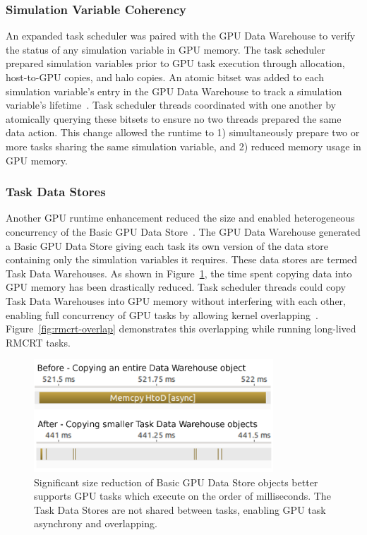 \documentclass[12pt]{article}
\begin{document}
\subsubsection{Simulation Variable Coherency}
\label{ch:simulation_variable_coherency}

An expanded task scheduler was paired with the GPU Data Warehouse to verify the status of any simulation variable in GPU memory.  The task scheduler prepared simulation variables prior to GPU task execution through allocation, host-to-GPU copies, and halo copies.  An atomic bitset was added to each simulation variable's entry in the GPU Data Warehouse to track a simulation variable's lifetime~\cite{ijpp16}.  Task scheduler threads coordinated with one another by atomically querying these bitsets to ensure no two threads prepared the same data action.  This change allowed the runtime to 1) simultaneously prepare two or more tasks sharing the same simulation variable, and 2) reduced memory usage in GPU memory.


\subsubsection{Task Data Stores}
\label{ch:task_data_warehouse}


Another GPU runtime enhancement reduced the size and enabled heterogeneous concurrency of the Basic GPU Data Store~\cite{wolfhpc15}.  The GPU Data Warehouse generated a Basic GPU Data Store giving each task its own version of the data store containing only the simulation variables it requires.  These data stores are termed Task Data Warehouses.   As shown in Figure~\ref{fig:task-data-warehouse}, the time spent copying data into GPU memory has been drastically reduced.  Task scheduler threads could copy Task Data Warehouses into GPU memory without interfering with each other, enabling full concurrency of GPU tasks by allowing kernel overlapping~\cite{ijpp16}.  Figure~\ref{fig:rmcrt-overlap} demonstrates this overlapping while running long-lived RMCRT tasks.  

\begin{figure}
	\centering
	\includegraphics[width=0.80\textwidth]{figures/task_datawarehouse.png}
	\caption{Significant size reduction of Basic GPU Data Store objects better supports GPU tasks which execute on the order of milliseconds.  The Task Data Stores are not shared between tasks, enabling GPU task asynchrony and overlapping. }
	\label{fig:task-data-warehouse}
\end{figure}
\end{document}
